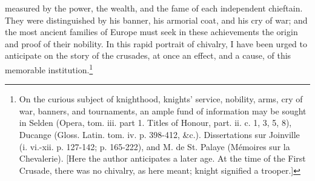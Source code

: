 measured by the power, the wealth, and the fame of each independent chieftain. They were distinguished by his banner, his armorial coat, and his cry of war; and the most ancient families of Europe must seek in these achievements the origin and proof of their nobility. In this rapid portrait of chivalry, I have been urged to anticipate on the story of the crusades, at once an effect, and a cause, of this memorable institution.\footnote{On the curious subject of knighthood, knights\texthebrew{}’ service, nobility, arms, cry of war, banners, and tournaments, an ample fund of information may be sought in Selden (Opera, tom. iii. part 1. Titles of Honour, part. ii. c. 1, 3, 5, 8), Ducange (Gloss. Latin. tom. iv. p. 398-412, \&c.). Dissertations sur Joinville (i. vi.-xii. p. 127-142; p. 165-222), and M. de St. Palaye (Mémoires sur la Chevalerie). [Here the author anticipates a later age. At the time of the First Crusade, there was no chivalry, as here meant; knight signified a trooper.]}

